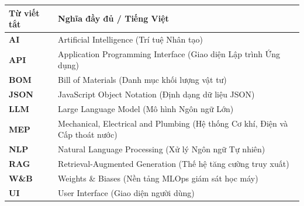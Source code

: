 
\begin{longtable}{|>{\bfseries}p{3cm}|p{12cm}|}
\hline
\textbf{Từ viết tắt} & \textbf{Nghĩa đầy đủ / Tiếng Việt} \\
\hline
AI & Artificial Intelligence (Trí tuệ Nhân tạo) \\
\hline
API & Application Programming Interface (Giao diện Lập trình Ứng dụng) \\
\hline
BOM & Bill of Materials (Danh mục khối lượng vật tư) \\
\hline
JSON & JavaScript Object Notation (Định dạng dữ liệu JSON) \\
\hline
LLM & Large Language Model (Mô hình Ngôn ngữ Lớn) \\
\hline
MEP & Mechanical, Electrical and Plumbing (Hệ thống Cơ khí, Điện và Cấp thoát nước) \\
\hline
NLP & Natural Language Processing (Xử lý Ngôn ngữ Tự nhiên) \\
\hline
RAG & Retrieval-Augmented Generation (Thế hệ tăng cường truy xuất) \\
\hline
W\&B & Weights \& Biases (Nền tảng MLOps giám sát học máy) \\
\hline
UI & User Interface (Giao diện người dùng) \\
\hline
\end{longtable}
